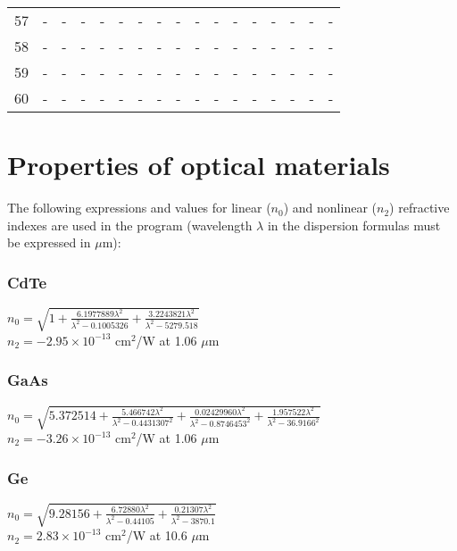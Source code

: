 \documentclass{report}
\begin{document}
\begin{appendices}
\begin{sidewaystable}
\begin{tabular}{|c|cccc|cccc|cccc|cccc|}
57 &   -   &   -   &   -   &   -   &   -   &   -   &   -   &   -   &   -   &   -   &   -   &   -   &   -   &   -   &   -   &   -   \\
58 &   -   &   -   &   -   &   -   &   -   &   -   &   -   &   -   &   -   &   -   &   -   &   -   &   -   &   -   &   -   &   -   \\
59 &   -   &   -   &   -   &   -   &   -   &   -   &   -   &   -   &   -   &   -   &   -   &   -   &   -   &   -   &   -   &   -   \\
60 &   -   &   -   &   -   &   -   &   -   &   -   &   -   &   -   &   -   &   -   &   -   &   -   &   -   &   -   &   -   &   -   \\
\hline
\end{tabular}
\end{sidewaystable}


\chapter{Properties of optical materials}
\label{appendix:optical_constants}
The following expressions and values for linear ($n_0$) and nonlinear ($n_2$) refractive indexes are used in the program (wavelength $\lambda$ in the dispersion formulas must be expressed in $\mu$m):

\subsection*{CdTe}
$n_0=\sqrt{1+\frac{6.1977889\lambda^2}{\lambda^2-0.1005326}+\frac{3.2243821\lambda^2}{\lambda^2-5279.518}}$ \cite{DeBell-1979}\\
$n_2 = -2.95\times 10^{-13}$ cm$^2$/W at 1.06 $\mu$m \cite{Sheik-Bahae-1991}
\subsection*{GaAs}
$n_0=\sqrt{5.372514+\frac{5.466742\lambda^2}{\lambda^2-0.4431307^2}+\frac{0.02429960\lambda^2}{\lambda^2-0.8746453^2}+\frac{1.957522\lambda^2}{\lambda^2-36.9166^2}}$ \cite{Skauli-2003}\\
$n_2 = -3.26\times 10^{-13}$ cm$^2$/W at 1.06 $\mu$m \cite{Sheik-Bahae-1991}
\subsection*{Ge}
$n_0=\sqrt{9.28156+\frac{6.72880\lambda^2}{\lambda^2-0.44105}+\frac{0.21307\lambda^2}{\lambda^2-3870.1}}$ \cite{Barnes-1979}\\
$n_2 = 2.83\times 10^{-13}$ cm$^2$/W at 10.6 $\mu$m \cite{Sheik-Bahae-1991}

\end{appendices}
\end{document}
